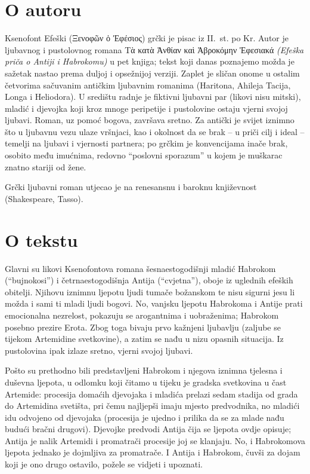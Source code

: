 
\section*{O autoru}

Ksenofont Efeški \textgreek[variant=ancient]{(Ξενοφῶν ὁ Ἐφέσιος)} grčki je pisac iz II.~st. po Kr. Autor je ljubavnog i pustolovnog romana \textgreek[variant=ancient]{Τὰ κατὰ Ἀνθίαν καὶ Ἁβροκόμην Ἐφεσιακά} \textit{(Efeška priča o Antiji i Habrokomu)} u pet knjiga; tekst koji danas poznajemo možda je sažetak nastao prema duljoj i opsežnijoj verziji. Zaplet je sličan onome u ostalim četvorima sačuvanim antičkim ljubavnim romanima (Haritona, Ahileja Tacija, Longa i Heliodora). U središtu radnje je fiktivni ljubavni par (likovi nisu mitski), mladić i djevojka koji kroz mnoge peripetije i pustolovine ostaju vjerni svojoj ljubavi. Roman, uz pomoć bogova, završava sretno. Za antički je svijet iznimno što u ljubavnu vezu ulaze vršnjaci, kao i okolnost da se brak – u priči cilj i ideal – temelji na ljubavi i vjernosti partnera; po grčkim je konvencijama inače brak, osobito među imućnima, redovno ``poslovni sporazum'' u kojem je muškarac znatno stariji od žene.

Grčki ljubavni roman utjecao je na renesansnu i baroknu književnost (Shakespeare, Tasso).

\section*{O tekstu}

Glavni su likovi Ksenofontova romana šesnaestogodišnji mladić Habrokom (``bujnokosi'') i četrnaestogodišnja Antija (``cvjetna''), oboje iz uglednih efeških obitelji. Njihovu iznimnu ljepotu ljudi tumače božanskom te nisu sigurni jesu li možda i sami ti mladi ljudi bogovi. No, vanjsku ljepotu Habrokoma i Antije prati emocionalna nezrelost, pokazuju se arogantnima i uobraženima; Habrokom posebno prezire Erota. Zbog toga bivaju prvo kažnjeni ljubavlju (zaljube se tijekom Artemidine svetkovine), a zatim se nađu u nizu opasnih situacija. Iz pustolovina ipak izlaze sretno, vjerni svojoj ljubavi.

Pošto su prethodno bili predstavljeni Habrokom i njegova iznimna tjelesna i duševna ljepota, u odlomku koji čitamo u tijeku je gradska svetkovina u čast Artemide: procesija domaćih djevojaka i mladića prelazi sedam stadija od grada do Artemidina svetišta, pri čemu najljepši imaju mjesto predvodnika, no mladići idu odvojeno od djevojaka (procesija je ujedno i prilika da se za mlade nađu budući bračni drugovi). Djevojke predvodi Antija čija se ljepota ovdje opisuje; Antija je nalik Artemidi i promatrači procesije joj se klanjaju. No, i Habrokomova ljepota jednako je dojmljiva za promatrače. I Antija i Habrokom, čuvši za dojam koji je ono drugo ostavilo, požele se vidjeti i upoznati.


